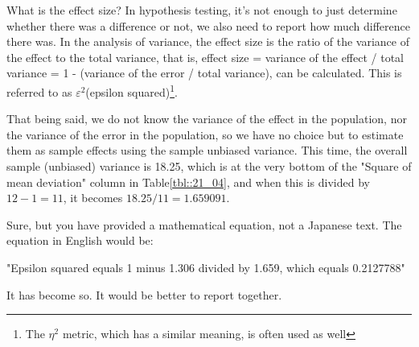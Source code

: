 \documentclass{ltjbook}
\begin{document}
What is the effect size?
In hypothesis testing, it's not enough to just determine whether there was a difference or not, we also need to report how much difference there was. In the analysis of variance, the effect size is the ratio of the variance of the effect to the total variance, that is, effect size = variance of the effect / total variance = 1 - (variance of the error / total variance), can be calculated. This is referred to as $\varepsilon^2$(epsilon squared)\footnote{The $\eta^2$ metric, which has a similar meaning, is often used as well}.

That being said, we do not know the variance of the effect in the population, nor the variance of the error in the population, so we have no choice but to estimate them as sample effects using the sample unbiased variance. This time, the overall sample (unbiased) variance is 18.25, which is at the very bottom of the "Square of mean deviation" column in Table\ref{tbl::21_04}, and when this is divided by $12-1=11$, it becomes $18.25/11=1.659091$.

Sure, but you have provided a mathematical equation, not a Japanese text. The equation in English would be:

"Epsilon squared equals 1 minus 1.306 divided by 1.659, which equals 0.2127788"

It has become so. It would be better to report together.

\end{document}
